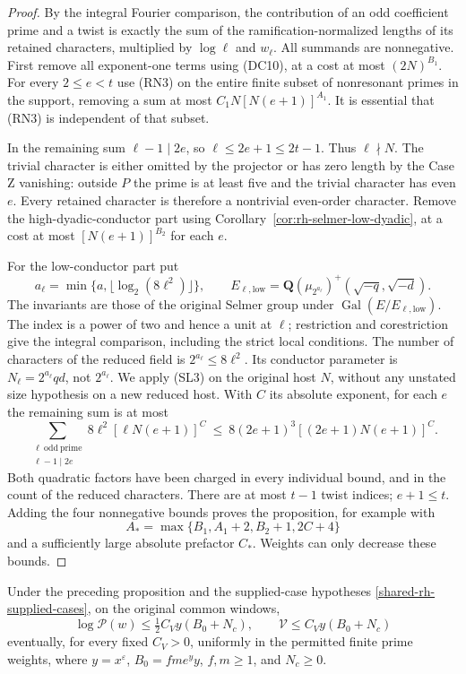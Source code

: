 \begin{proof}
By the integral Fourier comparison, the contribution of an odd
coefficient prime and a twist is exactly the sum of the
ramification-normalized lengths of its retained characters,
multiplied by \(\log\ell\) and \(w_\ell\). All summands are
nonnegative. First remove all exponent-one terms using (DC10),
at a cost at most \((2N)^{B_1}\). For every \(2\le e<t\) use
(RN3) on the entire finite subset of nonresonant primes in the
support, removing a sum at most \(C_1N[N(e+1)]^{A_1}\).
It is essential that (RN3) is independent of that subset.

In the remaining sum \(\ell-1\mid2e\), so
\(\ell\le2e+1\le2t-1\). Thus \(\ell\nmid N\).
The trivial character is either omitted by the projector
or has zero length by the Case Z vanishing: outside \(P\) the
prime is at least five and the trivial character has even
\(e\). Every retained character is therefore a nontrivial
even-order character. Remove the high-dyadic-conductor part
using Corollary~\ref{cor:rh-selmer-low-dyadic}, at a cost at most
\([N(e+1)]^{B_2}\) for each \(e\).

For the low-conductor part put
\[
 a_\ell=\min\{a,\lfloor\log_2(8\ell^2)\rfloor\},
 \qquad E_{\ell,\mathrm{low}}=
 \mathbf Q(\mu_{2^{a_\ell}})^+(\sqrt{-q},\sqrt{-d}).
\]
The invariants are those of the original Selmer group under
\(\operatorname{Gal}(E/E_{\ell,\mathrm{low}})\).
The index is a power of two and hence a unit at \(\ell\);
restriction and corestriction give the integral comparison,
including the strict local conditions. The number of characters
of the reduced field is \(2^{a_\ell}\le8\ell^2\).
Its conductor parameter is \(N_\ell=2^{a_\ell}qd\), not \(2^{a_\ell}\).
We apply (SL3) on the original host \(N\), without any
unstated size hypothesis on a new reduced host. With \(C\) its
absolute exponent, for each \(e\) the remaining sum is at most
\[
 \sum_{\substack{\ell\ \mathrm{odd\ prime}\\\ell-1\mid2e}}
 8\ell^2[\ell N(e+1)]^C
 \ \le\
 8(2e+1)^3[(2e+1)N(e+1)]^C.
\]
Both quadratic factors have been charged in every
individual bound, and in the count of the reduced characters.
There are at most \(t-1\) twist indices; \(e+1\le t\).
Adding the four nonnegative bounds proves the proposition,
for example with
\[
 A_*=\max\{B_1,A_1+2,B_2+1,2C+4\}
\]
and a sufficiently large absolute prefactor \(C_*\).
Weights can only decrease these bounds.
\end{proof}

\begin{corollary}
\label{rh-weighted-selmer-allowance}
Under the preceding proposition and the supplied-case hypotheses
\eqref{shared-rh-supplied-cases}, on the original common windows,
\[
 \log\mathcal P(w)\le\tfrac12 C_V y(B_0+N_c),
 \qquad
 \mathcal V\le C_V y(B_0+N_c)
\]
eventually, for every fixed \(C_V>0\), uniformly in the permitted
finite prime weights, where \(y=x^\varepsilon\),
\(B_0=fm e^y y\), \(f,m\ge1\), and \(N_c\ge0\).
\end{corollary}


